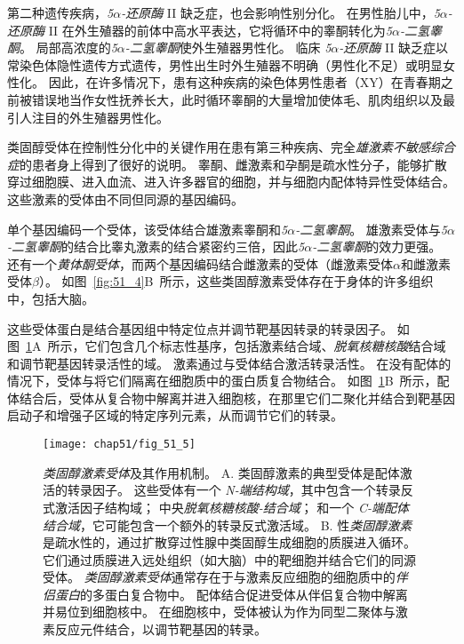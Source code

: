 第二种遗传疾病，\textit{5$\alpha$-还原酶} II 缺乏症，也会影响性别分化。
在男性胎儿中，\textit{5$\alpha$-还原酶} II 在外生殖器的前体中高水平表达，它将循环中的睾酮转化为\textit{5$\alpha$-二氢睾酮}。
局部高浓度的\textit{5$\alpha$-二氢睾酮}使外生殖器男性化。
临床 \textit{5$\alpha$-还原酶} II 缺乏症以常染色体隐性遗传方式遗传，男性出生时外生殖器不明确（男性化不足）或明显女性化。
因此，在许多情况下，患有这种疾病的染色体男性患者（XY）在青春期之前被错误地当作女性抚养长大，此时循环睾酮的大量增加使体毛、肌肉组织以及最引人注目的外生殖器男性化。


类固醇受体在控制性分化中的关键作用在患有第三种疾病、完全\textit{雄激素不敏感综合症}的患者身上得到了很好的说明。
睾酮、雌激素和孕酮是疏水性分子，能够扩散穿过细胞膜、进入血流、进入许多器官的细胞，并与细胞内配体特异性受体结合。
这些激素的受体由不同但同源的基因编码。


单个基因编码一个受体，该受体结合雄激素睾酮和\textit{5$\alpha$-二氢睾酮}。
雄激素受体与\textit{5$\alpha$-二氢睾酮}的结合比睾丸激素的结合紧密约三倍，因此\textit{5$\alpha$-二氢睾酮}的效力更强。
还有一个\textit{黄体酮受体}，而两个基因编码结合雌激素的受体（雌激素受体$\alpha$和雌激素受体$\beta$）。
如图~\ref{fig:51_4}B~所示，这些类固醇激素受体存在于身体的许多组织中，包括大脑。


这些受体蛋白是结合基因组中特定位点并调节靶基因转录的转录因子。
如图~\ref{fig:51_5}A~所示，它们包含几个标志性基序，包括激素结合域、\textit{脱氧核糖核酸}结合域和调节靶基因转录活性的域。
激素通过与受体结合激活转录活性。
在没有配体的情况下，受体与将它们隔离在细胞质中的蛋白质复合物结合。
如图~\ref{fig:51_5}B~所示，配体结合后，受体从复合物中解离并进入细胞核，在那里它们二聚化并结合到靶基因启动子和增强子区域的特定序列元素，从而调节它们的转录。


\begin{figure}[htbp]
	\centering
	\texttt{[image: chap51/fig\_51\_5]}
	\caption{\textit{类固醇激素受体}及其作用机制。
		A. 类固醇激素的典型受体是配体激活的转录因子。
		这些受体有一个 \textit{N-端结构域}，其中包含一个转录反式激活因子结构域；
		中央\textit{脱氧核糖核酸-结合域}；
		和一个 \textit{C-端配体结合域}，它可能包含一个额外的转录反式激活域。
		B. 性\textit{类固醇激素}是疏水性的，通过扩散穿过性腺中类固醇生成细胞的质膜进入循环。
		它们通过质膜进入远处组织（如大脑）中的靶细胞并结合它们的同源受体。
		\textit{类固醇激素受体}通常存在于与激素反应细胞的细胞质中的\textit{伴侣蛋白}的多蛋白复合物中。
		配体结合促进受体从伴侣复合物中解离并易位到细胞核中。
		在细胞核中，受体被认为作为同型二聚体与激素反应元件结合，以调节靶基因的转录\cite{wierman2007sex}。}
	\label{fig:51_5}
\end{figure}



